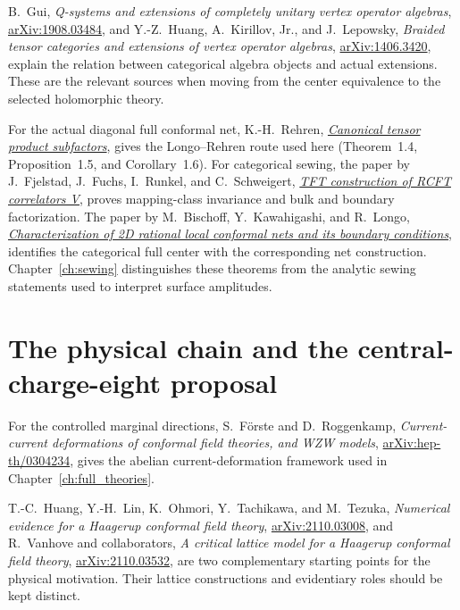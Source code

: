 B.~Gui,
\emph{Q-systems and extensions of completely unitary vertex
operator algebras},
\href{https://arxiv.org/abs/1908.03484}{arXiv:1908.03484},
and Y.-Z.~Huang, A.~Kirillov, Jr., and J.~Lepowsky,
\emph{Braided tensor categories and extensions of vertex operator
algebras},
\href{https://arxiv.org/abs/1406.3420}{arXiv:1406.3420},
explain the relation between categorical algebra objects and
actual extensions. These are the relevant sources when moving
from the center equivalence to the selected holomorphic theory.

For the actual diagonal full conformal net, K.-H.~Rehren,
\href{https://arxiv.org/abs/math/9911149}{\emph{Canonical tensor
product subfactors}}, gives the Longo--Rehren route used here
(Theorem~1.4, Proposition~1.5, and Corollary~1.6).
For categorical sewing, the paper by J.~Fjelstad, J.~Fuchs,
I.~Runkel, and C.~Schweigert,
\href{https://arxiv.org/abs/hep-th/0503194}{\emph{TFT construction
of RCFT correlators V}}, proves mapping-class invariance and
bulk and boundary factorization.
The paper by M.~Bischoff, Y.~Kawahigashi, and R.~Longo,
\href{https://arxiv.org/abs/1410.8848}{\emph{Characterization of
2D rational local conformal nets and its boundary conditions}},
identifies the categorical full center with the corresponding
net construction. Chapter~\ref{ch:sewing} distinguishes these
theorems from the analytic sewing statements used to interpret
surface amplitudes.

\section*{The physical chain and the central-charge-eight proposal}

For the controlled marginal directions,
S.~F\"orste and D.~Roggenkamp,
\emph{Current-current deformations of conformal field theories,
and WZW models},
\href{https://arxiv.org/abs/hep-th/0304234}{arXiv:hep-th/0304234},
gives the abelian current-deformation framework used in
Chapter~\ref{ch:full_theories}.

T.-C.~Huang, Y.-H.~Lin, K.~Ohmori, Y.~Tachikawa, and M.~Tezuka,
\emph{Numerical evidence for a Haagerup conformal field theory},
\href{https://arxiv.org/abs/2110.03008}{arXiv:2110.03008},
and R.~Vanhove and collaborators,
\emph{A critical lattice model for a Haagerup conformal field theory},
\href{https://arxiv.org/abs/2110.03532}{arXiv:2110.03532},
are two complementary starting points for the physical
motivation. Their lattice constructions and evidentiary roles
should be kept distinct.

